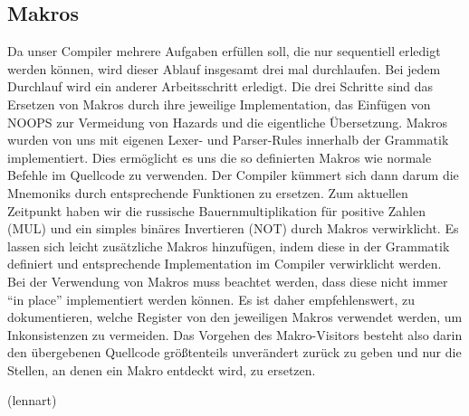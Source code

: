 \documentclass[paper=a4,fontsize=12pt,twocolumn]{scrreprt}
\begin{document}
\subsection{Makros}
Da unser Compiler mehrere Aufgaben erfüllen soll, die nur sequentiell erledigt werden können, wird dieser Ablauf insgesamt drei mal durchlaufen.
Bei jedem Durchlauf wird ein anderer Arbeitsschritt erledigt.
Die drei Schritte sind das Ersetzen von Makros durch ihre jeweilige Implementation, das Einfügen von NOOPS zur Vermeidung von Hazards und die eigentliche Übersetzung.
Makros wurden von uns mit eigenen Lexer- und Parser-Rules innerhalb der Grammatik implementiert.
Dies ermöglicht es uns die so definierten Makros wie normale Befehle im Quellcode zu verwenden.
Der Compiler kümmert sich dann darum die Mnemoniks durch entsprechende Funktionen zu ersetzen.
Zum aktuellen Zeitpunkt haben wir die russische Bauernmultiplikation für positive Zahlen (MUL) und ein simples binäres Invertieren (NOT) durch Makros verwirklicht.
Es lassen sich leicht zusätzliche Makros hinzufügen, indem diese in der Grammatik definiert  und entsprechende Implementation im Compiler verwirklicht werden.
Bei der Verwendung von Makros muss beachtet werden, dass diese nicht immer \enquote{in place} implementiert werden können.
Es ist daher empfehlenswert, zu dokumentieren, welche Register von den jeweiligen Makros verwendet werden, um Inkonsistenzen zu vermeiden.
Das Vorgehen des Makro-Visitors besteht also darin den übergebenen Quellcode größtenteils unverändert zurück zu geben und nur die Stellen, an denen ein Makro entdeckt wird, zu ersetzen.

(lennart)
\end{document}
